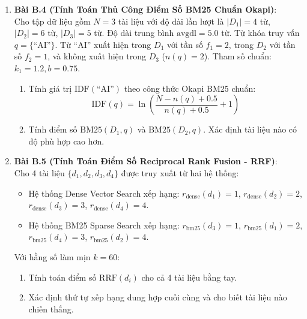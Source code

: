 \begin{enumerate}
  \item \textbf{Bài B.4 (Tính Toán Thủ Công Điểm Số BM25 Chuẩn Okapi)}: \\
  Cho tập dữ liệu gồm $N = 3$ tài liệu với độ dài lần lượt là $|D_1| = 4$ từ, $|D_2| = 6$ từ, $|D_3| = 5$ từ. Độ dài trung bình $\text{avgdl} = 5.0$ từ.
  Từ khóa truy vấn $q = \{\text{``AI''}\}$.
  Từ ``AI'' xuất hiện trong $D_1$ với tần số $f_1 = 2$, trong $D_2$ với tần số $f_2 = 1$, và không xuất hiện trong $D_3$ ($n(q) = 2$).
  Tham số chuẩn: $k_1 = 1.2, b = 0.75$.
  \begin{enumerate}
    \item Tính giá trị $\text{IDF}(\text{``AI''})$ theo công thức Okapi BM25 chuẩn:
    \begin{equation*}
    \text{IDF}(q) = \ln \left( \frac{N - n(q) + 0.5}{n(q) + 0.5} + 1 \right)
    \end{equation*}
    \item Tính điểm số $\text{BM25}(D_1, q)$ và $\text{BM25}(D_2, q)$. Xác định tài liệu nào có độ phù hợp cao hơn.
  \end{enumerate}

  \item \textbf{Bài B.5 (Tính Toán Điểm Số Reciprocal Rank Fusion - RRF)}: \\
  Cho 4 tài liệu $\{d_1, d_2, d_3, d_4\}$ được truy xuất từ hai hệ thống:
  \begin{itemize}
    \item Hệ thống Dense Vector Search xếp hạng: $r_{\text{dense}}(d_1) = 1$, $r_{\text{dense}}(d_2) = 2$, $r_{\text{dense}}(d_3) = 3$, $r_{\text{dense}}(d_4) = 4$.
    \item Hệ thống BM25 Sparse Search xếp hạng: $r_{\text{bm25}}(d_3) = 1$, $r_{\text{bm25}}(d_1) = 2$, $r_{\text{bm25}}(d_4) = 3$, $r_{\text{bm25}}(d_2) = 4$.
  \end{itemize}
  Với hằng số làm mịn $k = 60$:
  \begin{enumerate}
    \item Tính toán điểm số $\text{RRF}(d_i)$ cho cả 4 tài liệu bằng tay.
    \item Xác định thứ tự xếp hạng dung hợp cuối cùng và cho biết tài liệu nào chiến thắng.
  \end{enumerate}


\end{enumerate}
